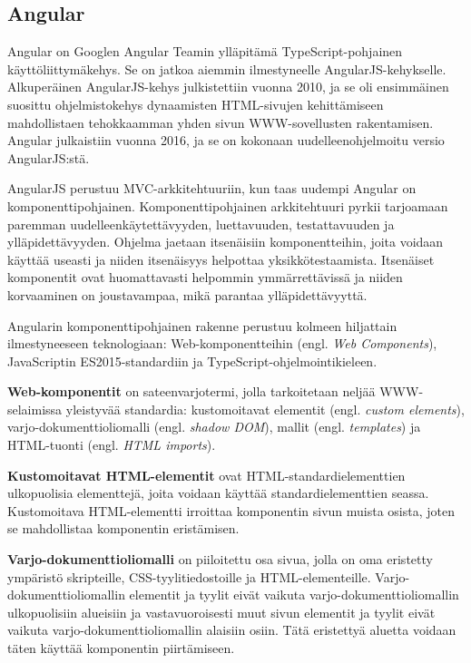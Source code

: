 \documentclass[utf8]{gradu3}
\begin{document}
\subsection{Angular}

Angular on Googlen Angular Teamin ylläpitämä TypeScript-pohjainen käyttöliittymäkehys. Se on jatkoa aiemmin ilmestyneelle AngularJS-kehykselle. Alkuperäinen AngularJS-kehys julkistettiin vuonna 2010, ja se oli ensimmäinen suosittu ohjelmistokehys dynaamisten HTML-sivujen kehittämiseen mahdollistaen tehokkaamman yhden sivun WWW-sovellusten rakentamisen. Angular julkaistiin vuonna 2016, ja se on kokonaan uudelleenohjelmoitu versio AngularJS:stä.

AngularJS perustuu MVC-arkkitehtuuriin, kun taas uudempi Angular on komponenttipohjainen. Komponenttipohjainen arkkitehtuuri pyrkii tarjoamaan paremman uudelleenkäytettävyyden, luettavuuden, testattavuuden ja ylläpidettävyyden. Ohjelma jaetaan itsenäisiin komponentteihin, joita voidaan käyttää useasti ja niiden itsenäisyys helpottaa yksikkötestaamista. Itsenäiset komponentit ovat huomattavasti helpommin ymmärrettävissä ja niiden korvaaminen on joustavampaa, mikä parantaa ylläpidettävyyttä. \parencite[]{good-and-bad-angular} 

Angularin komponenttipohjainen rakenne perustuu kolmeen hiljattain ilmestyneeseen teknologiaan: Web-komponentteihin (engl. \textit{Web Components}), JavaScriptin ES2015-standardiin ja TypeScript-ohjelmointikieleen.

\textbf{Web-komponentit} on sateenvarjotermi, jolla tarkoitetaan neljää WWW-selaimissa yleistyvää standardia: kustomoitavat elementit (engl. \textit{custom elements}), varjo-dokumenttioliomalli (engl. \textit{shadow DOM}), mallit (engl. \textit{templates}) ja HTML-tuonti (engl. \textit{HTML imports}). 

\textbf{Kustomoitavat HTML-elementit} ovat HTML-standardielementtien ulkopuolisia elementtejä, joita voidaan käyttää standardielementtien seassa. Kustomoitava HTML-elementti irroittaa komponentin sivun muista osista, joten se mahdollistaa komponentin eristämisen. 

\textbf{Varjo-dokumenttioliomalli} on piiloitettu osa sivua, jolla on oma eristetty ympäristö skripteille, CSS-tyylitiedostoille ja HTML-elementeille. Varjo-dokumenttioliomallin elementit ja tyylit eivät vaikuta varjo-dokumenttioliomallin ulkopuolisiin alueisiin ja vastavuoroisesti muut sivun elementit ja tyylit eivät vaikuta varjo-dokumenttioliomallin alaisiin osiin. Tätä eristettyä aluetta voidaan täten käyttää komponentin piirtämiseen. 
\end{document}
